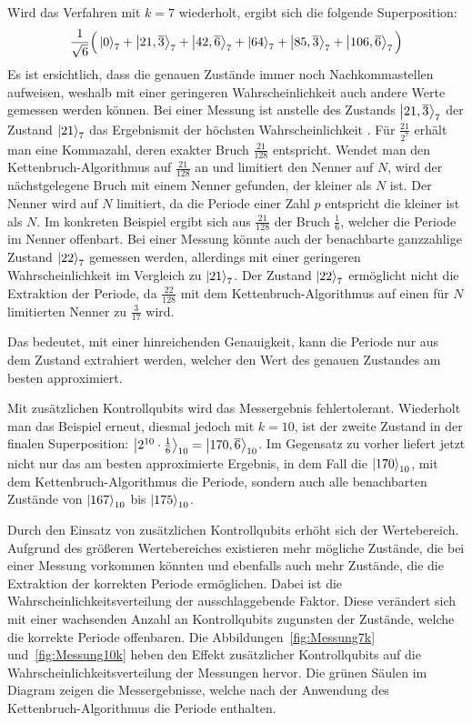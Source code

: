 Wird das Verfahren mit \(k=7\) wiederholt, ergibt sich die folgende Superposition:
\[\frac{1}{\sqrt{6}}
\Big(\ket{0}_7 +\ket{21,\overline{3}}_7 + \ket{42,\overline{6}}_7+
\ket{64}_7+\ket{85,\overline{3}}_7 + \ket{106,\overline{6}}_7
\Big) \]
Es ist ersichtlich, dass die genauen Zustände immer noch Nachkommastellen aufweisen, 
weshalb mit einer geringeren Wahrscheinlichkeit auch andere Werte gemessen werden können.
Bei einer Messung ist anstelle des Zustands \(\ket{21,\overline{3}}_7\) der Zustand \(\ket{21}_7\) das Ergebnismit der höchsten Wahrscheinlichkeit .
Für \(\frac{21}{2^{7}}\) erhält man eine Kommazahl, deren exakter Bruch \(\frac{21}{128}\) entspricht.
Wendet man den Kettenbruch-Algorithmus auf \(\frac{21}{128}\) an und limitiert den Nenner auf \(N\), 
wird der nächstgelegene Bruch mit einem Nenner gefunden, der kleiner als \(N\) ist.
Der Nenner wird auf \(N\) limitiert, da die Periode einer Zahl \(p\) entspricht die kleiner ist als \(N\).
Im konkreten Beispiel ergibt sich aus \(\frac{21}{128}\) der Bruch \(\frac{1}{6}\), 
welcher die Periode im Nenner offenbart.
Bei einer Messung könnte auch der benachbarte ganzzahlige Zustand \(\ket{22}_7\) gemessen werden, 
allerdings mit einer geringeren Wahrscheinlichkeit im Vergleich zu \(\ket{21}_7\).
Der Zustand \(\ket{22}_7\) ermöglicht nicht die Extraktion der Periode, 
da \(\frac{22}{128}\) mit dem Kettenbruch-Algorithmus auf einen für \(N\) limitierten Nenner
zu \(\frac{3}{17}\) wird.

Das bedeutet, 
mit einer hinreichenden Genauigkeit, kann die Periode nur aus dem Zustand extrahiert werden, 
welcher den Wert des genauen Zustandes am besten approximiert.

Mit zusätzlichen Kontrollqubits wird das Messergebnis fehlertolerant.
Wiederholt man das Beispiel erneut, diesmal jedoch mit \(k=10\), 
ist der zweite Zustand in der finalen Superposition: 
\(\ket{2^{10} \cdot \frac{1}{6}}_{10} =\ket{170,\overline{6}}_{10}\).
Im Gegensatz zu vorher liefert jetzt nicht nur das am besten approximierte Ergebnis, 
in dem Fall die \(\ket{170}_{10}\), mit dem Kettenbruch-Algorithmus die Periode, 
sondern auch alle benachbarten Zustände von \(\ket{167}_{10}\) bis \(\ket{175}_{10}\).

Durch den Einsatz von zusätzlichen Kontrollqubits erhöht sich der Wertebereich. 
Aufgrund des größeren Wertebereiches existieren mehr mögliche Zustände, 
die bei einer Messung vorkommen könnten und ebenfalls auch mehr Zustände, 
die die Extraktion der korrekten Periode ermöglichen. 
Dabei ist die Wahrscheinlichkeitsverteilung der ausschlaggebende Faktor. 
Diese verändert sich mit einer wachsenden Anzahl an Kontrollqubits zugunsten der Zustände, 
welche die korrekte Periode offenbaren.
Die Abbildungen~\ref{fig:Messung7k} und~\ref{fig:Messung10k} 
heben den Effekt zusätzlicher Kontrollqubits auf die Wahrscheinlichkeitsverteilung der Messungen hervor.
Die grünen Säulen im Diagram zeigen die Messergebnisse, 
welche nach der Anwendung des Kettenbruch-Algorithmus die Periode enthalten.

